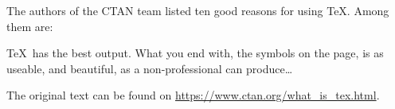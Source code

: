 \documentclass{article}
\begin{document}
The authors of the CTAN team listed ten good reasons
for using \TeX. Among them are:

\TeX\ has the best output. What you end with,
the symbols on the page, is as useable, and beautiful,
as a non-professional can produce\ldots

The original text can be found on
\url{https://www.ctan.org/what_is_tex.html}.
\end{document}
